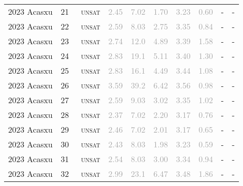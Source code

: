 \begin{center}
{\begin{longtable}{@{}llllllllll@{}}
2023 Acasxu & 21 & ~\textsc{unsat} & \textcolor{darkgray}{2.45} & \textcolor{darkgray}{7.02} & \textcolor{darkgray}{1.70} & \textcolor{darkgray}{3.23} & \textcolor{darkgray}{0.60} & - & - \\
2023 Acasxu & 22 & ~\textsc{unsat} & \textcolor{darkgray}{2.59} & \textcolor{darkgray}{8.03} & \textcolor{darkgray}{2.75} & \textcolor{darkgray}{3.35} & \textcolor{darkgray}{0.84} & - & - \\
2023 Acasxu & 23 & ~\textsc{unsat} & \textcolor{darkgray}{2.74} & \textcolor{darkgray}{12.0} & \textcolor{darkgray}{4.89} & \textcolor{darkgray}{3.39} & \textcolor{darkgray}{1.58} & - & - \\
2023 Acasxu & 24 & ~\textsc{unsat} & \textcolor{darkgray}{2.83} & \textcolor{darkgray}{19.1} & \textcolor{darkgray}{5.11} & \textcolor{darkgray}{3.40} & \textcolor{darkgray}{1.30} & - & - \\
2023 Acasxu & 25 & ~\textsc{unsat} & \textcolor{darkgray}{2.83} & \textcolor{darkgray}{16.1} & \textcolor{darkgray}{4.49} & \textcolor{darkgray}{3.44} & \textcolor{darkgray}{1.08} & - & - \\
2023 Acasxu & 26 & ~\textsc{unsat} & \textcolor{darkgray}{3.59} & \textcolor{darkgray}{39.2} & \textcolor{darkgray}{6.42} & \textcolor{darkgray}{3.56} & \textcolor{darkgray}{0.98} & - & - \\
2023 Acasxu & 27 & ~\textsc{unsat} & \textcolor{darkgray}{2.59} & \textcolor{darkgray}{9.03} & \textcolor{darkgray}{3.02} & \textcolor{darkgray}{3.35} & \textcolor{darkgray}{1.02} & - & - \\
2023 Acasxu & 28 & ~\textsc{unsat} & \textcolor{darkgray}{2.37} & \textcolor{darkgray}{7.02} & \textcolor{darkgray}{2.20} & \textcolor{darkgray}{3.17} & \textcolor{darkgray}{0.76} & - & - \\
2023 Acasxu & 29 & ~\textsc{unsat} & \textcolor{darkgray}{2.46} & \textcolor{darkgray}{7.02} & \textcolor{darkgray}{2.01} & \textcolor{darkgray}{3.17} & \textcolor{darkgray}{0.65} & - & - \\
2023 Acasxu & 30 & ~\textsc{unsat} & \textcolor{darkgray}{2.43} & \textcolor{darkgray}{8.03} & \textcolor{darkgray}{1.98} & \textcolor{darkgray}{3.23} & \textcolor{darkgray}{0.59} & - & - \\
2023 Acasxu & 31 & ~\textsc{unsat} & \textcolor{darkgray}{2.54} & \textcolor{darkgray}{8.03} & \textcolor{darkgray}{3.00} & \textcolor{darkgray}{3.34} & \textcolor{darkgray}{0.94} & - & - \\
2023 Acasxu & 32 & ~\textsc{unsat} & \textcolor{darkgray}{2.99} & \textcolor{darkgray}{23.1} & \textcolor{darkgray}{6.47} & \textcolor{darkgray}{3.48} & \textcolor{darkgray}{1.86} & - & - \\

\end{longtable}}
\end{center}
